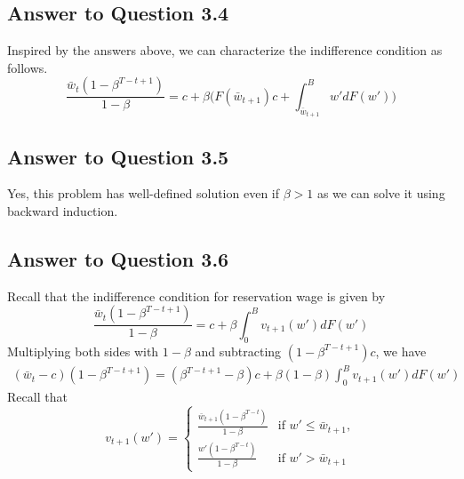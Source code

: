 \documentclass[11pt]{article}
\theoremstyle{definition}
\theoremstyle{boldtitle} %
\numberwithin{equation}{section}
\numberwithin{figure}{section}
\numberwithin{table}{section}
\begin{document}
\subsection*{Answer to Question 3.4}
Inspired by the answers above,
we can characterize the indifference condition as follows. 
\[
\frac{\bar{w}_t (1 - \beta^{T-t+1})}{1 - \beta} = c + \beta \bigg(F(\bar{w}_{t+1}) c + \int_{\bar{w}_{t+1}}^B w' dF(w') \bigg)
\]



\subsection*{Answer to Question 3.5}
Yes, this problem has well-defined solution even if $\beta > 1$ as we can solve it using backward induction.


\subsection*{Answer to Question 3.6}
Recall that the indifference condition for reservation wage is given by 
\begin{equation}
  \frac{\bar{w}_t (1 - \beta^{T-t+1} )}{1 - \beta} = c + \beta \int_{0}^B v_{t+1}(w')dF(w')
\end{equation}
Multiplying both sides with $1 - \beta$ and subtracting $(1 - \beta^{T-t+1}) c$, we have 
\begin{align*}
  (\bar{w}_t - c) (1 - \beta^{T-t+1}) = (\beta^{T-t+1} - \beta ) c + \beta (1 - \beta) \int_{0}^B v_{t+1}(w')dF(w')
\end{align*}
Recall that 
\[
  v_{t+1}(w') = \begin{cases}
  \frac{\bar{w}_{t+1} (1 - \beta^{T-t})}{1 - \beta} &  \text{if } w' \leq \bar{w}_{t+1},\\
  \frac{w' (1 - \beta^{T-t})}{1 - \beta}  & \text{if }  w' > \bar{w}_{t+1}
\end{cases}
\]
\end{document}
